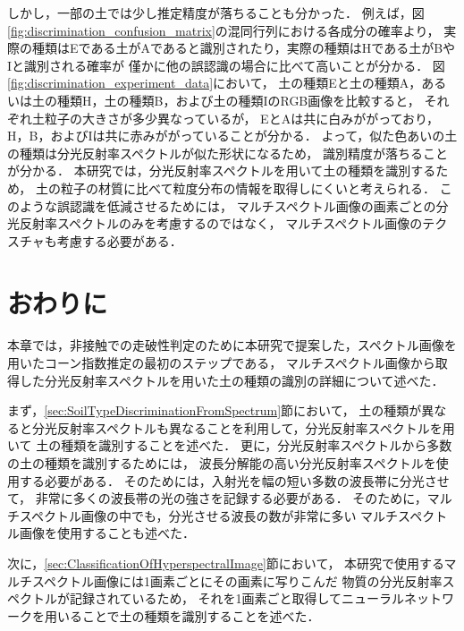 しかし，一部の土では少し推定精度が落ちることも分かった．
例えば，図\ref{fig:discrimination_confusion_matrix}の混同行列における各成分の確率より，
実際の種類はEである土がAであると識別されたり，実際の種類はHである土がBやIと識別される確率が
僅かに他の誤認識の場合に比べて高いことが分かる．
図\ref{fig:discrimination_experiment_data}において，
土の種類Eと土の種類A，あるいは土の種類H，土の種類B，および土の種類IのRGB画像を比較すると，
それぞれ土粒子の大きさが多少異なっているが，
EとAは共に白みががっており，H，B，およびIは共に赤みががっていることが分かる．
よって，似た色あいの土の種類は分光反射率スペクトルが似た形状になるため，
識別精度が落ちることが分かる．
本研究では，分光反射率スペクトルを用いて土の種類を識別するため，
土の粒子の材質に比べて粒度分布の情報を取得しにくいと考えられる．
このような誤認識を低減させるためには，
マルチスペクトル画像の画素ごとの分光反射率スペクトルのみを考慮するのではなく，
マルチスペクトル画像のテクスチャも考慮する必要がある．

\newpage


\section{おわりに}

本章では，非接触での走破性判定のために本研究で提案した，スペクトル画像を用いたコーン指数推定の最初のステップである，
マルチスペクトル画像から取得した分光反射率スペクトルを用いた土の種類の識別の詳細について述べた．

まず，\ref{sec:SoilTypeDiscriminationFromSpectrum}節において，
土の種類が異なると分光反射率スペクトルも異なることを利用して，分光反射率スペクトルを用いて
土の種類を識別することを述べた．
更に，分光反射率スペクトルから多数の土の種類を識別するためには，
波長分解能の高い分光反射率スペクトルを使用する必要がある．
そのためには，入射光を幅の短い多数の波長帯に分光させて，
非常に多くの波長帯の光の強さを記録する必要がある．
そのために，マルチスペクトル画像の中でも，分光させる波長の数が非常に多い
マルチスペクトル画像を使用することも述べた．

次に，\ref{sec:ClassificationOfHyperspectralImage}節において，
本研究で使用するマルチスペクトル画像には1画素ごとにその画素に写りこんだ
物質の分光反射率スペクトルが記録されているため，
それを1画素ごと取得してニューラルネットワークを用いることで土の種類を識別することを述べた．

